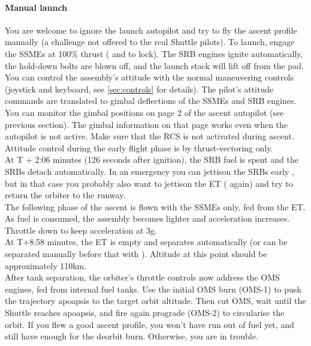 \documentclass[Orbiter User Manual.tex]{subfiles}
\begin{document}
\paragraph{Manual launch}
You are welcome to ignore the launch autopilot and try to fly the ascent profile manually (a challenge not offered to the real Shuttle pilots). To launch, engage the SSMEs at 100\% thrust ( and  to lock). The SRB engines ignite automatically, the hold-down bolts are blown off, and the launch stack will lift off from the pad. You can control the assembly's attitude with the normal maneuvering controls (joystick and keyboard, see \ref{sec:controls} for details). The pilot's attitude commands are translated to gimbal deflections of the SSMEs and SRB engines. You can monitor the gimbal positions on page 2 of the ascent autopilot (see previous section). The gimbal information on that page works even when the autopilot is not active. Make sure that the RCS is not activated during ascent. Attitude control during the early flight phase is by thrust-vectoring only.\\

At T + 2:06 minutes (126 seconds after ignition), the SRB fuel is spent and the SRBs detach automatically. In an emergency you can jettison the SRBs early , but in that case you probably also want to jettison the ET ( again) and try to return the orbiter to the runway.\\

The following phase of the ascent is flown with the SSMEs only, fed from the ET. As fuel is consumed, the assembly becomes lighter and acceleration increases. Throttle down to keep acceleration at 3g.\\

At T+8:58 minutes, the ET is empty and separates automatically (or can be separated manually before that with ). Altitude at this point should be approximately 110km.\\

After tank separation, the orbiter's throttle controls now address the OMS engines, fed from internal fuel tanks. Use the initial OMS burn (OMS-1) to push the trajectory apoapsis to the target orbit altitude. Then cut OMS, wait until the Shuttle reaches apoapsis, and fire again prograde (OMS-2) to circularise the orbit. If you flew a good ascent profile, you won't have run out of fuel yet, and still have enough for the deorbit burn. Otherwise, you are in trouble.\\
\end{document}
